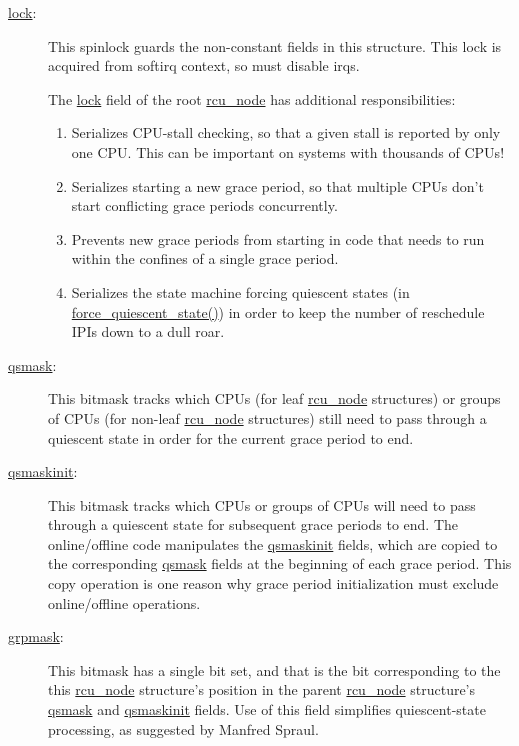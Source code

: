 \begin{description}
\item[\url{lock}:]
	This spinlock guards the non-constant fields in this structure.
	This lock is acquired from softirq context, so must disable
	irqs.

 \QuickQuizEnd

	The \url{lock} field of the root \url{rcu_node} has additional
	responsibilities:
	\begin{enumerate}
	\item	Serializes CPU-stall checking, so that a given stall
		is reported by only one CPU.
		This can be important on systems with thousands of
		CPUs!
	\item	Serializes starting a new grace period, so that
		multiple CPUs don't start conflicting grace periods
		concurrently.
	\item	Prevents new grace periods from starting in code that
		needs to run within the confines of a single grace period.
	\item	Serializes the state machine forcing quiescent states
		(in \url{force_quiescent_state()}) in order to
		keep the number of reschedule IPIs down to a dull
		roar.
	\end{enumerate}
\item[\url{qsmask}:]
	This bitmask tracks which CPUs (for leaf \url{rcu_node} structures)
	or groups of CPUs (for non-leaf \url{rcu_node} structures)
	still need to pass through a quiescent state in order for the
	current grace period to end.
\item[\url{qsmaskinit}:]
	This bitmask tracks which CPUs or groups of CPUs will need to
	pass through a quiescent state for subsequent grace periods
	to end.
	The online/offline code manipulates the \url{qsmaskinit} fields,
	which are copied to the corresponding \url{qsmask} fields at
	the beginning of each grace period.
	This copy operation is one reason why grace period initialization
	must exclude online/offline operations.
\item[\url{grpmask}:]
	This bitmask has a single bit set, and that is the bit corresponding
	to the this \url{rcu_node} structure's position in the parent
	\url{rcu_node} structure's \url{qsmask} and \url{qsmaskinit}
	fields.
	Use of this field simplifies quiescent-state processing,
	as suggested by Manfred Spraul.


\end{description}
